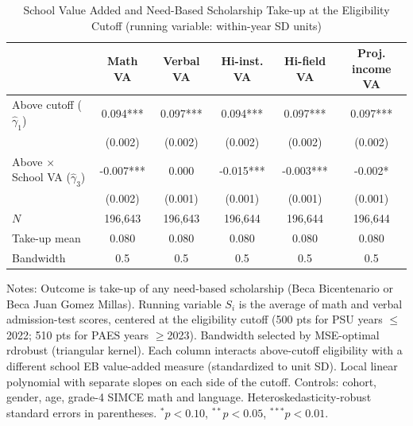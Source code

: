 \begin{table}[!htbp]
\centering
\caption{School Value Added and Need-Based Scholarship Take-up at the Eligibility Cutoff (running variable: within-year SD units)}
\label{tab:any-scholarship-rd-va-interaction-sd}
\begin{tabular}{lccccc}
\toprule
 & Math VA & Verbal VA & Hi-inst. VA & Hi-field VA & Proj. income VA \\
\midrule
Above cutoff ($\hat{\gamma}_1$) & 0.094*** & 0.097*** & 0.094*** & 0.097*** & 0.097*** \\
        & (0.002) & (0.002) & (0.002) & (0.002) & (0.002) \\
Above $\times$ School VA ($\hat{\gamma}_3$) & -0.007*** & 0.000 & -0.015*** & -0.003*** & -0.002* \\
        & (0.002) & (0.001) & (0.001) & (0.001) & (0.001) \\
\midrule
$N$ & 196,643 & 196,643 & 196,644 & 196,644 & 196,644 \\
Take-up mean & 0.080 & 0.080 & 0.080 & 0.080 & 0.080 \\
Bandwidth & 0.5 & 0.5 & 0.5 & 0.5 & 0.5 \\
\bottomrule
\end{tabular}
\par\medskip\footnotesize
\begin{minipage}{\textwidth}
Notes: Outcome is take-up of any need-based scholarship (Beca Bicentenario or Beca Juan Gomez Millas). Running variable $S_i$ is the average of math and verbal admission-test scores, centered at the eligibility cutoff (500 pts for PSU years $\leq$2022; 510 pts for PAES years $\geq$2023). Bandwidth selected by MSE-optimal rdrobust (triangular kernel). Each column interacts above-cutoff eligibility with a different school EB value-added measure (standardized to unit SD). Local linear polynomial with separate slopes on each side of the cutoff. Controls: cohort, gender, age, grade-4 SIMCE math and language. Heteroskedasticity-robust standard errors in parentheses. $^{*}p<0.10$, $^{**}p<0.05$, $^{***}p<0.01$.
\end{minipage}
\end{table}
